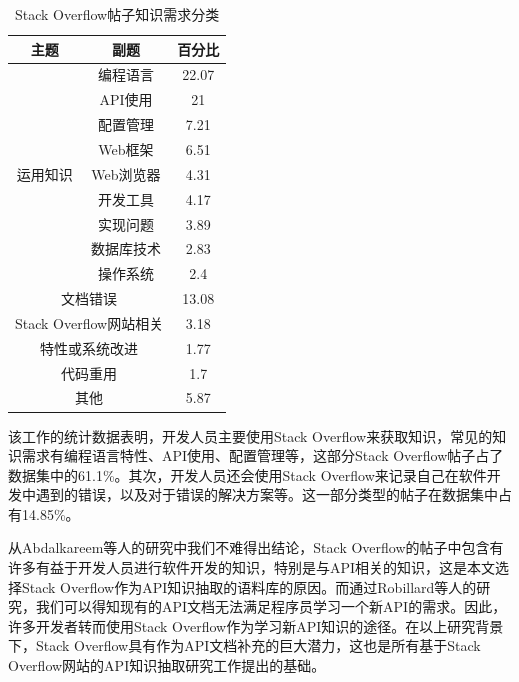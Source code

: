 \begin{table}[h]
    \centering
    \caption{Stack Overflow帖子知识需求分类\cite{DBLP:journals/software/AbdalkareemSR17}}
    \label{表2-2}
    \begin{tabular}{|c|c|c|}
    \hline
    主题                         & 副题          & 百分比   \\ \hline
    \multirow{9}{*}{运用知识}      & 编程语言        & 22.07 \\ \cline{2-3} 
                               & API使用       & 21    \\ \cline{2-3} 
                               & 配置管理        & 7.21  \\ \cline{2-3} 
                               & Web框架       & 6.51  \\ \cline{2-3} 
                               & Web浏览器      & 4.31  \\ \cline{2-3} 
                               & 开发工具        & 4.17  \\ \cline{2-3} 
                               & 实现问题        & 3.89  \\ \cline{2-3} 
                               & 数据库技术       & 2.83  \\ \cline{2-3} 
                               & 操作系统        & 2.4   \\ \hline
    \multicolumn{2}{|c|}{文档错误}               & 13.08 \\ \hline
    \multicolumn{2}{|c|}{Stack Overflow网站相关} & 3.18  \\ \hline
    \multicolumn{2}{|c|}{特性或系统改进}            & 1.77  \\ \hline
    \multicolumn{2}{|c|}{代码重用}               & 1.7   \\ \hline
    \multicolumn{2}{|c|}{其他}                 & 5.87  \\ \hline
    \end{tabular}
    \end{table}

该工作的统计数据表明，开发人员主要使用Stack Overflow来获取知识，常见的知识需求有编程语言特性、API使用、配置管理等，这部分Stack Overflow帖子占了数据集中的61.1\%。其次，开发人员还会使用Stack Overflow来记录自己在软件开发中遇到的错误，以及对于错误的解决方案等。这一部分类型的帖子在数据集中占有14.85\%。

从Abdalkareem等人的研究中我们不难得出结论，Stack Overflow的帖子中包含有许多有益于开发人员进行软件开发的知识，特别是与API相关的知识，这是本文选择Stack Overflow作为API知识抽取的语料库的原因。而通过Robillard等人的研究，我们可以得知现有的API文档无法满足程序员学习一个新API的需求。因此，许多开发者转而使用Stack Overflow作为学习新API知识的途径\cite{DBLP:conf/chi/MamykinaMMHH11}。在以上研究背景下，Stack Overflow具有作为API文档补充的巨大潜力，这也是所有基于Stack Overflow网站的API知识抽取研究工作提出的基础。

